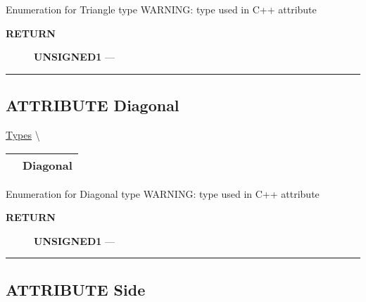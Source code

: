 \par





Enumeration for Triangle type WARNING: type used in C++ attribute








\par
\begin{description}
\item [\colorbox{tagtype}{\color{white} \textbf{\textsf{RETURN}}}] \textbf{UNSIGNED1} --- 
\end{description}




\rule{\linewidth}{0.5pt}
\subsection*{\textsf{\colorbox{headtoc}{\color{white} ATTRIBUTE}
Diagonal}}

\hypertarget{ecldoc:ecldoc-Diagonal}{}
\hspace{0pt} \hyperlink{ecldoc:PBblas.Types}{Types} \textbackslash 

{\renewcommand{\arraystretch}{1.5}
\begin{tabularx}{\textwidth}{|>{\raggedright\arraybackslash}l|X|}
\hline
\hspace{0pt}\mytexttt{\color{red} } & \textbf{Diagonal} \\
\hline
\end{tabularx}
}

\par





Enumeration for Diagonal type WARNING: type used in C++ attribute








\par
\begin{description}
\item [\colorbox{tagtype}{\color{white} \textbf{\textsf{RETURN}}}] \textbf{UNSIGNED1} --- 
\end{description}




\rule{\linewidth}{0.5pt}
\subsection*{\textsf{\colorbox{headtoc}{\color{white} ATTRIBUTE}
Side}}

